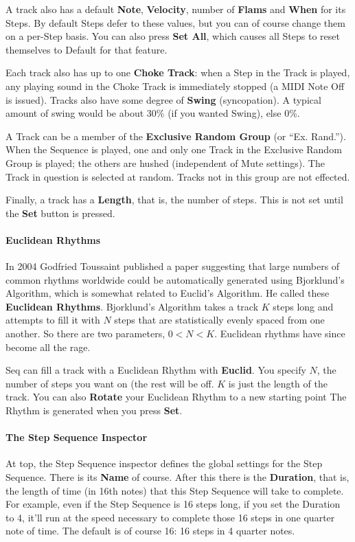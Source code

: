 \documentclass[twoside,10pt]{article}
\begin{document}
A track also has a default {\bf Note}, {\bf Velocity}, number of {\bf Flams} and {\bf When} for its Steps.  By default Steps defer to these values, but you can of course change them on a per-Step basis.  You can also press {\bf Set All}, which causes all Steps to reset themselves to Default for that feature.

Each track also has up to one {\bf Choke Track}: when a Step in the Track is played, any playing sound in the Choke Track is immediately stopped (a MIDI Note Off is issued).  Tracks also have some degree of {\bf Swing} (syncopation).  A typical amount of swing would be about 30\% (if you wanted Swing), else 0\%.

A Track can be a member of the {\bf Exclusive Random Group} (or ``Ex. Rand.'').  When the Sequence is played, one and only one Track in the Exclusive Random Group is played; the others are hushed (independent of Mute settings).  The Track in question is selected at random. Tracks not in this group are not effected.

Finally, a track has a {\bf Length}, that is, the number of steps.  This is not set until the {\bf Set} button is pressed.

\paragraph{Euclidean Rhythms}

In 2004 Godfried Toussaint published a paper suggesting that large numbers of common rhythms worldwide could be automatically generated using Bjorklund's Algorithm, which is somewhat related to Euclid's Algorithm.  He called these {\bf Euclidean Rhythms}.  Bjorklund's Algorithm takes a track \(K\) steps long and attempts to fill it with \(N\) steps that are statistically evenly spaced from one another.  So there are two parameters, \(0 < N < K\).  Euclidean rhythms have since become all the rage.

Seq can fill a track with a Euclidean Rhythm with {\bf Euclid}.  You specify \(N\), the number of steps you want on (the rest will be off.  \(K\) is just the length of the track.  You can also {\bf Rotate} your Euclidean Rhythm to a new starting point  The Rhythm is generated when you press {\bf Set}.

\paragraph{The Step Sequence Inspector}

At top, the Step Sequence inspector defines the global settings for the Step Sequence.  There is its {\bf Name} of course.  After this there is the {\bf Duration}, that is, the length of time (in 16th notes) that this Step Sequence will take to complete.  For example, even if the Step Sequence is 16 steps long, if you set the Duration to 4, it'll run at the speed necessary to complete those 16 steps in one quarter note of time.  The default is of course 16: 16 steps in 4 quarter notes.
\end{document}
